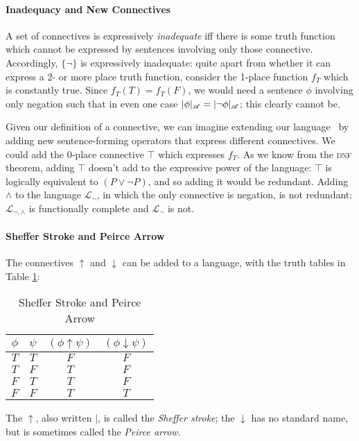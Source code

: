\paragraph{Inadequacy and New Connectives}

A set of connectives is expressively \emph{inadequate} iff there is some truth function which cannot be expressed by sentences involving only those connective. Accordingly, $\{\neg\}$  is expressively inadequate: quite apart from whether it can express a 2- or more place truth function, consider the 1-place function $f_{T}$ which is constantly true. Since $f_{T}(T)=f_{T}(F)$,  we would need a sentence $\phi$ involving only negation such that in even one case $|\phi|_{\mathscr{A}}=|\neg\phi|_{\mathscr{A}}$; this clearly cannot be.

Given our definition of a connective, we can imagine extending our language \lone\ by adding new sentence-forming operators that express different connectives. We could add the $0$-place connective $\top$ which expresses $f_{T}$. As we know from the \textsc{\lowercase{DNF}} theorem, adding $\top$ doesn't add to the expressive power of the language: $\top$ is logically equivalent to $(P \vee \neg P)$, and so adding it would be redundant.  Adding $\wedge$ to the language $\mathcal{L}_{\neg}$, in which the only connective is negation, is not redundant: $\mathcal{L}_{\neg,\wedge}$ is functionally complete and $\mathcal{L}_{\neg}$ is not. 

\paragraph{Sheffer Stroke and Peirce Arrow}

The connectives $\uparrow$ and $\downarrow$ can be added to a language, with the truth tables in Table \ref{ttwo}: 
\begin{table}\label{ttwo}
\centering
\begin{tabular}{cc|c|c}
\toprule
	$\phi$ & $\psi$ & $(\phi \uparrow \psi)$ & $(\phi \downarrow \psi)$\\
	\midrule
	$T$ & $T$ & $F$ & $F$\\
	$T$ & $F$ & $T$ & $F$\\
	$F$ & $T$ & $T$ & $F$\\
	$F$ & $F$ & $T$ & $T$\\	
	\bottomrule
\end{tabular}	\caption{Sheffer Stroke and Peirce Arrow}
\end{table}The $\uparrow$, also written $|$, is called the \emph{Sheffer stroke}; the $\downarrow$ has no standard name, but is sometimes called the \emph{Peirce arrow}. 

